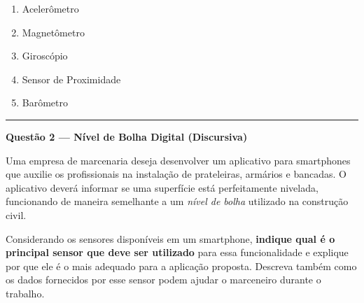 \documentclass[12pt]{article}
\begin{document}
\vspace{0.4cm}

\begin{enumerate}[label=\alph*)]
    \item Acelerômetro
    \item Magnetômetro
    \item Giroscópio
    \item Sensor de Proximidade
    \item Barômetro
\end{enumerate}


\vspace{0.8cm}
\noindent\rule{\textwidth}{0.8pt}
\vspace{0.3cm}

\noindent\textbf{Questão 2 — Nível de Bolha Digital (Discursiva)}

\vspace{0.3cm}
\noindent
Uma empresa de marcenaria deseja desenvolver um aplicativo para smartphones que auxilie os
profissionais na instalação de prateleiras, armários e bancadas. O aplicativo deverá informar
se uma superfície está perfeitamente nivelada, funcionando de maneira semelhante a um
\textit{nível de bolha} utilizado na construção civil.

\vspace{0.3cm}
\noindent
Considerando os sensores disponíveis em um smartphone, \textbf{indique qual é o principal
sensor que deve ser utilizado} para essa funcionalidade e explique por que ele é o mais
adequado para a aplicação proposta. Descreva também como os dados fornecidos por esse sensor
podem ajudar o marceneiro durante o trabalho.

\vspace{0.5cm}
\end{document}
